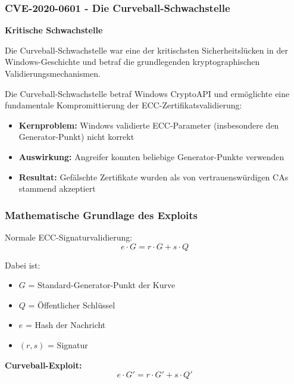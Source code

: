 \documentclass{article}
\begin{document}
\subsubsection{CVE-2020-0601 - Die Curveball-Schwachstelle}

\begin{warningbox}
\textbf{Kritische Schwachstelle}

Die Curveball-Schwachstelle war eine der kritischsten Sicherheitslücken in der Windows-Geschichte und betraf die grundlegenden kryptographischen Validierungsmechanismen.
\end{warningbox}

Die Curveball-Schwachstelle betraf Windows CryptoAPI und ermöglichte eine fundamentale Kompromittierung der ECC-Zertifikatsvalidierung:

\begin{itemize}[leftmargin=1.5cm]
    \item \textbf{Kernproblem:} Windows validierte ECC-Parameter (insbesondere den Generator-Punkt) nicht korrekt
    \item \textbf{Auswirkung:} Angreifer konnten beliebige Generator-Punkte verwenden
    \item \textbf{Resultat:} Gefälschte Zertifikate wurden als von vertrauenswürdigen CAs stammend akzeptiert
\end{itemize}

\subsubsection{Mathematische Grundlage des Exploits}

Normale ECC-Signaturvalidierung:
\begin{equation}
e \cdot G = r \cdot G + s \cdot Q
\end{equation}

Dabei ist:
\begin{itemize}
    \item $G$ = Standard-Generator-Punkt der Kurve
    \item $Q$ = Öffentlicher Schlüssel
    \item $e$ = Hash der Nachricht
    \item $(r,s)$ = Signatur
\end{itemize}

\textbf{Curveball-Exploit:}
\begin{equation}
e \cdot G' = r \cdot G' + s \cdot Q'
\end{equation}
\end{document}
